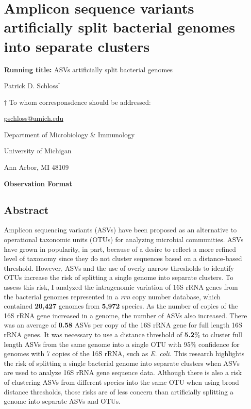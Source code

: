 \documentclass[
]{article}
\author{}
\date{\vspace{-2.5em}}
\begin{document}
\hypertarget{amplicon-sequence-variants-artificially-split-bacterial-genomes-into-separate-clusters}{%
\section{Amplicon sequence variants artificially split bacterial genomes
into separate
clusters}\label{amplicon-sequence-variants-artificially-split-bacterial-genomes-into-separate-clusters}}

\vspace{20mm}

\textbf{Running title:} ASVs artificially split bacterial genomes

\vspace{20mm}

Patrick D. Schloss\({^\dagger}\)

\vspace{40mm}

\({\dagger}\) To whom corresponsdence should be addressed:

\href{mailto:pschloss@umich.edu}{pschloss@umich.edu}

Department of Microbiology \& Immunology

University of Michigan

Ann Arbor, MI 48109

\vspace{20mm}

\textbf{Observation Format}

\newpage

\hypertarget{abstract}{%
\subsection{Abstract}\label{abstract}}

Amplicon sequencing variants (ASVs) have been proposed as an alternative
to operational taxonomic units (OTUs) for analyzing microbial
communities. ASVs have grown in popularity, in part, because of a desire
to reflect a more refined level of taxonomy since they do not cluster
sequences based on a distance-based threshold. However, ASVs and the use
of overly narrow thresholds to identify OTUs increase the risk of
splitting a single genome into separate clusters. To assess this risk, I
analyzed the intragenomic variation of 16S rRNA genes from the bacterial
genomes represented in a \emph{rrn} copy number database, which
contained \textbf{20,427} genomes from \textbf{5,972} species. As the
number of copies of the 16S rRNA gene increased in a genome, the number
of ASVs also increased. There was an average of \textbf{0.58} ASVs per
copy of the 16S rRNA gene for full length 16S rRNA genes. It was
necessary to use a distance threshold of \textbf{5.2}\% to cluster full
length ASVs from the same genome into a single OTU with 95\% confidence
for genomes with 7 copies of the 16S rRNA, such as \emph{E. coli}. This
research highlights the risk of splitting a single bacterial genome into
separate clusters when ASVs are used to analyze 16S rRNA gene sequence
data. Although there is also a risk of clustering ASVs from different
species into the same OTU when using broad distance thresholds, those
risks are of less concern than artificially splitting a genome into
separate ASVs and OTUs.
\end{document}
